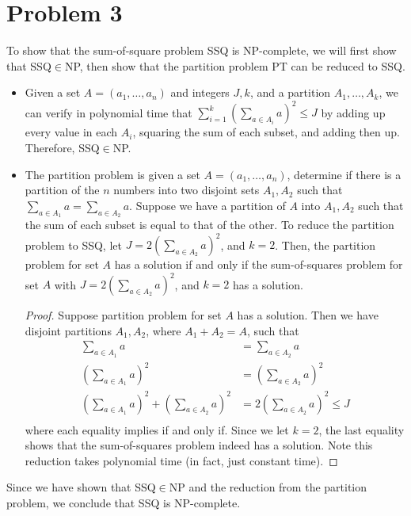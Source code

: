 \documentclass{article}
\begin{document}
\section*{Problem 3}
To show that the sum-of-square problem SSQ is NP-complete, we will first show that SSQ$\in$NP, then show that the partition problem PT can be reduced to SSQ.
\begin{itemize}
\item Given a set $A = (a_1,\dots, a_n)$ and integers $J,k$, and a partition $A_1,\dots,A_k$, we can verify in polynomial time that $\sum_{i=1}^{k}(\sum_{a\in A_i} a)^2 \leq J$ by adding up every value in each $A_i$, squaring the sum of each subset, and adding then up. Therefore, SSQ$\in$NP.

\item The partition problem is given a set $A = (a_1, \dots, a_n)$, determine if there is a partition of the $n$ numbers into two disjoint sets $A_1,A_2$ such that $\sum_{a\in A_1} a = \sum_{a\in A_2} a$. Suppose we have a partition of $A$ into $A_1,A_2$ such that the sum of each subset is equal to that of the other. To reduce the partition problem to SSQ, let $J = 2(\sum_{a\in A_2} a)^2$, and $k=2$. Then, the partition problem for set $A$ has a solution if and only if the sum-of-squares problem for set $A$ with $J = 2(\sum_{a\in A_2} a)^2$, and $k=2$ has a solution.

\begin{proof}
Suppose partition problem for set $A$ has a solution. Then we have disjoint partitions $A_1, A_2$, where $A_1+A_2=A$, such that
\begin{align*}
\sum_{a\in A_1} a &= \sum_{a\in A_2} a \\
\left(\sum_{a\in A_1} a \right)^2 &= \left(\sum_{a\in A_2} a \right)^2 \\
\left(\sum_{a\in A_1} a \right)^2 + \left(\sum_{a\in A_2} a \right)^2  &= 2 \left(\sum_{a\in A_2} a \right)^2 \leq J\\
\end{align*}
where each equality implies if and only if. Since we let $k=2$, the last equality shows that the sum-of-squares problem indeed has a solution. Note this reduction takes polynomial time (in fact, just constant time).
\end{proof}
\end{itemize}
Since we have shown that SSQ$\in$NP and the reduction from the partition problem, we conclude that SSQ is NP-complete.

\pagebreak
\end{document}
